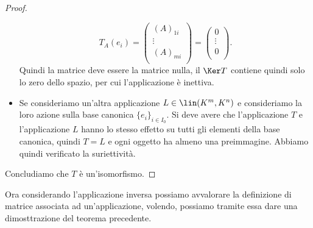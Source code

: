\begin{proof}
\begin{itemize}
			\begin{equation*}
				T_A(e_i) =
				\begin{pmatrix}
					(A)_{1i}\\
					\vdots\\
					(A)_{mi}\\
				\end{pmatrix}=
				\begin{pmatrix}
					0\\
					\vdots\\
					0\\
				\end{pmatrix}.
			\end{equation*}
			Quindi la matrice deve essere la matrice nulla, il $\Ker T$ contiene quindi solo lo zero dello spazio, per cui l'applicazione è inettiva.
			\item Se consideriamo un'altra applicazione $L\in \lin(K^m,K^n)$ e consideriamo la loro azione sulla base canonica $\{e_i\}_{i\in I_0}$.
				Si deve avere che l'applicazione $T$ e l'applicazione $L$ hanno lo stesso effetto su tutti gli elementi della base canonica, quindi $T=L$ e ogni oggetto ha almeno una preimmagine.
				Abbiamo quindi verificato la suriettività.
	\end{itemize}
	Concludiamo che $T$ è un'isomorfismo.
\end{proof}

Ora considerando l'applicazione inversa possiamo avvalorare la definizione di matrice associata ad un'applicazione, volendo, possiamo tramite essa dare una dimosttrazione del teorema precedente.
